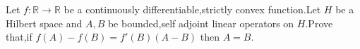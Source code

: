 Let $f:\mathbb{R}\to \mathbb{R}$ be a continuously differentiable,strictly convex function.Let $H$ be a Hilbert space and $A,B$ be bounded,self adjoint linear operators on $H$.Prove that,if $f(A)-f(B)=f'(B)(A-B)$ then $A=B$.